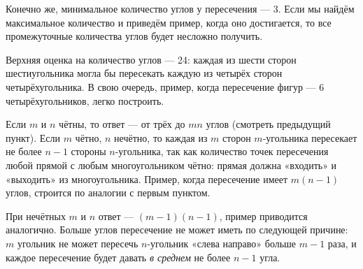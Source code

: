 
\begin{itemize}

\itB Конечно же, минимальное количество углов у пересечения — 3. Если мы найдём максимальное количество и приведём пример, когда оно достигается, то все промежуточные количества углов будет несложно получить.

Верхняя оценка на количество углов — 24: каждая из шести сторон шестиугольника могла бы пересекать каждую из четырёх сторон четырёхугольника. В свою очередь, пример, когда пересечение фигур — 6 четырёхугольников, легко построить.

\itC Если $m$ и $n$ чётны, то ответ — от трёх до $mn$ углов (смотреть предыдущий пункт). Если $m$ чётно, $n$ нечётно, то каждая из $m$ сторон $m$-угольника пересекает не более $n-1$ стороны $n$-угольника, так как количество точек пересечения любой прямой с любым многоугольником чётно: прямая должна «входить» и «выходить» из многоугольника. Пример, когда пересечение имеет $m(n-1)$ углов, строится по аналогии с первым пунктом.

При нечётных $m$ и $n$ ответ — $(m-1)(n-1)$, пример приводится аналогично. Больше углов пересечение не может иметь по следующей причине: $m$ угольник не может пересечь $n$-угольник «слева направо» больше $m-1$ раза, и каждое пересечение будет давать {\it в среднем} не более $n-1$ угла.
\end{itemize}